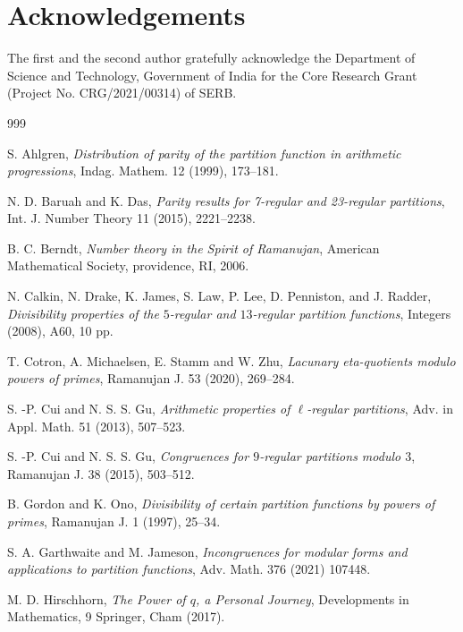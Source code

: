 \documentclass[reqno]{amsart}
\theoremstyle{definition}
\theoremstyle{remark}
\numberwithin{equation}{section}
\begin{document}
\section{Acknowledgements}
The first and the second author gratefully acknowledge the Department of Science and Technology,
Government of India for the Core Research Grant (Project No. CRG/2021/00314) of SERB.
\begin{thebibliography}{999}

S. Ahlgren, {\it Distribution of parity of the partition function in arithmetic progressions}, Indag. Mathem. 12 (1999), 173--181.
		
N. D. Baruah and K. Das, {\it Parity results for 7-regular and 23-regular partitions}, Int. J. Number Theory 11 (2015), 2221--2238.

B. C. Berndt, {\it Number theory in the Spirit of Ramanujan}, American Mathematical Society, providence, RI, 2006.

N. Calkin, N. Drake, K. James, S. Law, P. Lee, D. Penniston, and J. Radder, {\it Divisibility properties of the $5$-regular and $13$-regular partition functions}, Integers (2008), A60, 10 pp.

T. Cotron, A. Michaelsen, E. Stamm and W. Zhu, {\it Lacunary eta-quotients modulo powers of primes}, Ramanujan J. 53 (2020), 269--284.

S. -P. Cui and N. S. S. Gu, {\it Arithmetic properties of $\ell$-regular partitions}, Adv. in Appl. Math. 51 (2013), 507--523.

S. -P. Cui and N. S. S. Gu, {\it Congruences for $9$-regular partitions modulo $3$}, Ramanujan J. 38 (2015), 503--512.

B. Gordon and K. Ono, {\it Divisibility of certain partition functions by powers of primes}, Ramanujan J. 1 (1997), 25--34.

S. A. Garthwaite and M. Jameson, {\it Incongruences for modular forms and applications to partition functions}, Adv. Math. 376 (2021) 107448.

M. D. Hirschhorn, {\it The Power of $q$, a Personal Journey}, Developments in Mathematics, 9 Springer, Cham (2017).


\end{thebibliography}
\end{document}
